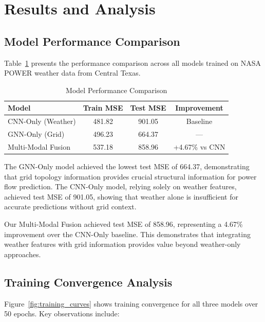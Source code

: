 \documentclass[journal,12pt,onecolumn]{IEEEtran}
\begin{document}
\section{Results and Analysis}
\label{sec:results}

\subsection{Model Performance Comparison}

Table~\ref{tab:performance} presents the performance comparison across all models trained on NASA POWER weather data from Central Texas.

\begin{table}[htbp]
\caption{Model Performance Comparison}
\label{tab:performance}
\centering
\begin{tabular}{lccc}
\toprule
\textbf{Model} & \textbf{Train MSE} & \textbf{Test MSE} & \textbf{Improvement} \\
\midrule
CNN-Only (Weather) & 481.82 & 901.05 & Baseline \\
GNN-Only (Grid) & 496.23 & 664.37 & --- \\
Multi-Modal Fusion & 537.18 & 858.96 & +4.67\% vs CNN \\
\bottomrule
\end{tabular}
\end{table}

The GNN-Only model achieved the lowest test MSE of 664.37, demonstrating that grid topology information provides crucial structural information for power flow prediction. The CNN-Only model, relying solely on weather features, achieved test MSE of 901.05, showing that weather alone is insufficient for accurate predictions without grid context.

Our Multi-Modal Fusion achieved test MSE of 858.96, representing a 4.67\% improvement over the CNN-Only baseline. This demonstrates that integrating weather features with grid information provides value beyond weather-only approaches.

\subsection{Training Convergence Analysis}

Figure~\ref{fig:training_curves} shows training convergence for all three models over 50 epochs. Key observations include:
\end{document}
